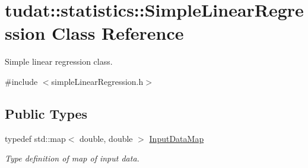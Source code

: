\hypertarget{classtudat_1_1statistics_1_1SimpleLinearRegression}{}\section{tudat\+:\+:statistics\+:\+:Simple\+Linear\+Regression Class Reference}
\label{classtudat_1_1statistics_1_1SimpleLinearRegression}


Simple linear regression class.  




{\ttfamily \#include $<$simple\+Linear\+Regression.\+h$>$}

\subsection*{Public Types}
\begin{DoxyCompactItemize}
\item 
typedef std\+::map$<$ double, double $>$ \hyperlink{classtudat_1_1statistics_1_1SimpleLinearRegression_aeec88aae0a92c1f4c90c6e736111724c}{Input\+Data\+Map}
\begin{DoxyCompactList}\small\item\em Type definition of map of input data. \end{DoxyCompactList}\end{DoxyCompactItemize}
